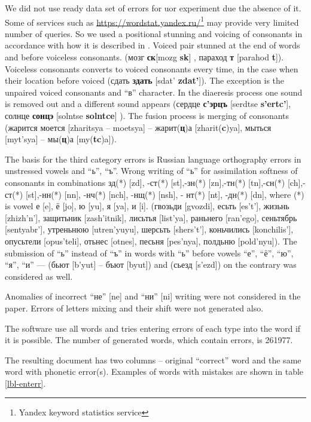 \documentclass{svproc}
\begin{document}
We did not use ready data set of errors for uor experiment due the absence of it. Some of services such as \url{https://wordstat.yandex.ru/}\footnote[1]{Yandex keyword statistics service} may provide very limited number of queries.
So we used a positional stunning and voicing of consonants in accordance with how it is described in \cite{Skripnik-2010,Kastkin-1999}. Voiced pair stunned at the end of words and before voiceless consonants. (мозг {\textbf{ск}}[mozg {\textbf{sk}}] , параход {\textbf{т}} [parahod {\textbf{t}}]). Voiceless consonants converts to voiced consonants every time, in the case when their location before voiced (сдать {\textbf{здать}} [sdat’ {\textbf{zdat’}}]). The exception is the unpaired voiced consonants and “в” character. In the diaeresis process one sound is removed out and a different sound appears (сердце {\textbf{с'эрцъ}} [serdtse {\textbf{s’ertc’}}], солнце {\textbf{сонцэ}} [solntse {\textbf{solntce}}] ). The fusion process is merging of consonants (жарится моется [zharitsya – moetsya] – жарит(\textbf{ц})а [zharit(\textbf{c})ya], мыться [myt’sya] – мы(\textbf{ц})а [my(\textbf{tc})a]).

The basis for the third category errors is Russian language orthography errors in unstressed vowels and “ь”, “ъ”.
Wrong writing of “ь” for assimilation softness of consonants in combinations зд(*) [zd], -ст(*) [st],-зн(*) [zn],-тн(*) [tn],-сн(*) [ch],-ст(*) [st],-нн(*) [nn], -нч(*) [nch], -нщ(*) [nsh], - нт(*) [nt], -дн(*) [dn], where (*) is vowel е [e], ё [jo], ю [yu], я [ya], и [i]. (гвозьди [gvozdi], есьть [es’t’], жизьнь [zhizh’n’], защитьник [zash’itnik], лисьтья [list’ya], раньнего [ran’ego], сеньтябрь [sentyabr’], утреньнюю [utren’yuyu],  шерсьть [shers’t’], коньчились [konchilis’], опусьтели [opus’teli], отьнес [otnes], песьня [pes’nya], полдьню [pold’nyu]). The submission of ``ь'' instead of ``ъ'' in words with ``ь'' before vowels ``е'', ``ё'', ``ю'', ``я'', ``и'' --- (бьют [b’yut] – бъют [byut]) and (сьезд [s’ezd]) on the contrary was considered as well.

Anomalies of incorrect ``не'' [ne] and ``ни'' [ni] writing were not considered in the paper. Errors of letters mixing and their shift were not generated also.

The software use all words and tries entering errors of each type into the word if it is possible. The number of generated words, which contain errors, is 261977.

The resulting document has two columns – original “correct” word and the same word with phonetic error(s). Examples of words with mistakes are shown in table \ref{lbl-enterr}.
\end{document}
